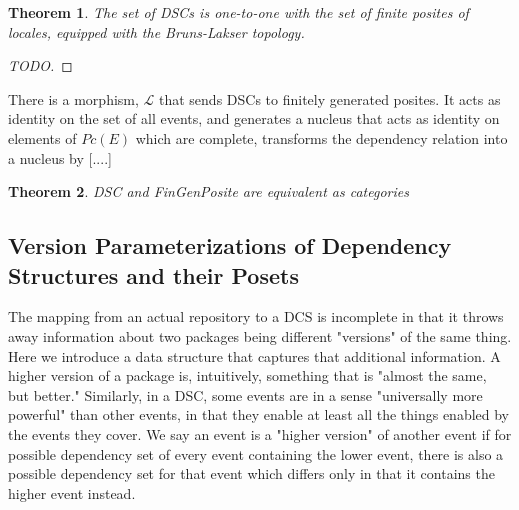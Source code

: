 \documentclass[hoptionsi,review,format=acmsmall]{acmart}
\newtheorem{theorem}{Theorem}[section]
\theoremstyle{definition}
\newcommand{\Lcc}{\mathcal{L}}
\begin{document}
\begin{theorem}
The set of DSCs is one-to-one with the set of finite posites of locales, equipped with the Bruns-Lakser topology.
\end{theorem}
\begin{proof}
[TODO]
\end{proof}






There is a morphism, \(\Lcc\) that sends DSCs to finitely generated posites. It acts as identity on the set of all events, and generates a nucleus that acts as identity on elements of \(Pc(E)\) which are complete,  transforms the dependency relation into a nucleus by [....]


\begin{theorem}
DSC and FinGenPosite are equivalent as categories
\end{theorem}






\subsection{Version Parameterizations of Dependency Structures and their Posets}

The mapping from an actual repository to a DCS is incomplete in that it throws away information about two packages being different "versions" of the same thing. Here we introduce a data structure that captures that additional information. A higher version of a package is, intuitively, something that is "almost the same, but better." Similarly, in a DSC, some events are in a sense "universally more powerful" than other events, in that they enable at least all the things enabled by the events they cover. We say an event is a "higher version" of another event if for possible dependency set of every event containing the lower event, there is also a possible dependency set for that event which differs only in that it contains the higher event instead.
\end{document}
